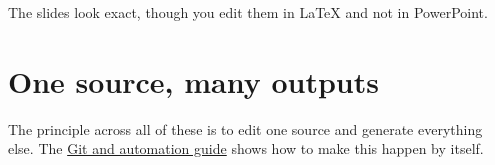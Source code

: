 The slides look exact, though you edit them in LaTeX and not in PowerPoint.

\section{One source, many outputs}\label{one-source-many-outputs}

The principle across all of these is to edit one source and generate everything else. The \href{../../git-ci/}{Git and automation guide} shows how to make this happen by itself.

